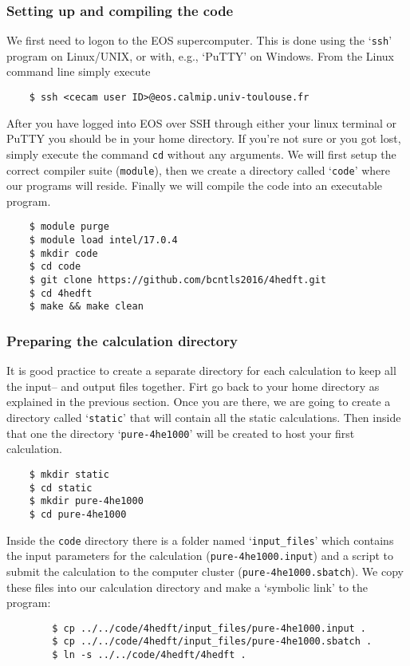 \documentclass[10pt,a4paper]{article}
\begin{document}
	\subsubsection{Setting up and compiling the code}\label{compiling}
	We first need to logon to the EOS supercomputer. This is done using the `\verb|ssh|' program on Linux/UNIX, or with, e.g., `PuTTY' on Windows. From the Linux command line simply execute
	\begin{verbatim}
	$ ssh <cecam user ID>@eos.calmip.univ-toulouse.fr
	\end{verbatim}
	After you have logged into EOS over SSH through either your linux terminal or PuTTY you should be in your home directory. If you're not sure or you got lost, simply execute the command \verb|cd| without any arguments. We will first setup the correct compiler suite (\verb|module|), then we create a directory called `\verb|code|' where our programs will reside. Finally we will compile the code into an executable program.
	\begin{verbatim}
	$ module purge
	$ module load intel/17.0.4
	$ mkdir code
	$ cd code
	$ git clone https://github.com/bcntls2016/4hedft.git
	$ cd 4hedft
	$ make && make clean
	\end{verbatim}
	
	\subsubsection{Preparing the calculation directory}
	\label{sec:setup}
	It is good practice to create a separate directory for each calculation to keep all the input-- and output files together. Firt go back to your home directory as explained in the previous section. Once you are there, we are going to create a directory called `\verb|static|' that will contain all the static calculations. Then inside that one the directory `\verb|pure-4he1000|' will be created to host your first calculation.
	\begin{verbatim}
	$ mkdir static
	$ cd static
	$ mkdir pure-4he1000
	$ cd pure-4he1000
	\end{verbatim}
	
	Inside the \verb|code| directory there is a folder named `\verb|input_files|' which contains the input parameters for the calculation (\verb|pure-4he1000.input|) and a script to submit the calculation to the computer cluster (\verb|pure-4he1000.sbatch|). We copy these files into our calculation directory and make a `symbolic link' to the program:
	\begin{verbatim}
		$ cp ../../code/4hedft/input_files/pure-4he1000.input .
		$ cp ../../code/4hedft/input_files/pure-4he1000.sbatch .
		$ ln -s ../../code/4hedft/4hedft .
	\end{verbatim}
	
\end{document}
